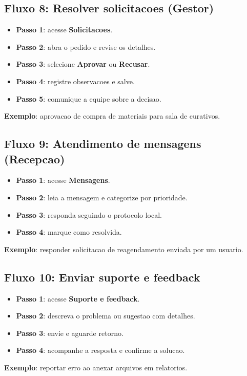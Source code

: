 \documentclass[12pt,a4paper]{article}
\begin{document}
\subsection{Fluxo 8: Resolver solicitacoes (Gestor)}
\begin{itemize}[leftmargin=*]
  \item \textbf{Passo 1}: acesse \textbf{Solicitacoes}.
  \item \textbf{Passo 2}: abra o pedido e revise os detalhes.
  \item \textbf{Passo 3}: selecione \textbf{Aprovar} ou \textbf{Recusar}.
  \item \textbf{Passo 4}: registre observacoes e salve.
  \item \textbf{Passo 5}: comunique a equipe sobre a decisao.
\end{itemize}
\textbf{Exemplo}: aprovacao de compra de materiais para sala de curativos.

\subsection{Fluxo 9: Atendimento de mensagens (Recepcao)}
\begin{itemize}[leftmargin=*]
  \item \textbf{Passo 1}: acesse \textbf{Mensagens}.
  \item \textbf{Passo 2}: leia a mensagem e categorize por prioridade.
  \item \textbf{Passo 3}: responda seguindo o protocolo local.
  \item \textbf{Passo 4}: marque como resolvida.
\end{itemize}
\textbf{Exemplo}: responder solicitacao de reagendamento enviada por um usuario.

\subsection{Fluxo 10: Enviar suporte e feedback}
\begin{itemize}[leftmargin=*]
  \item \textbf{Passo 1}: acesse \textbf{Suporte e feedback}.
  \item \textbf{Passo 2}: descreva o problema ou sugestao com detalhes.
  \item \textbf{Passo 3}: envie e aguarde retorno.
  \item \textbf{Passo 4}: acompanhe a resposta e confirme a solucao.
\end{itemize}
\textbf{Exemplo}: reportar erro ao anexar arquivos em relatorios.
\end{document}
